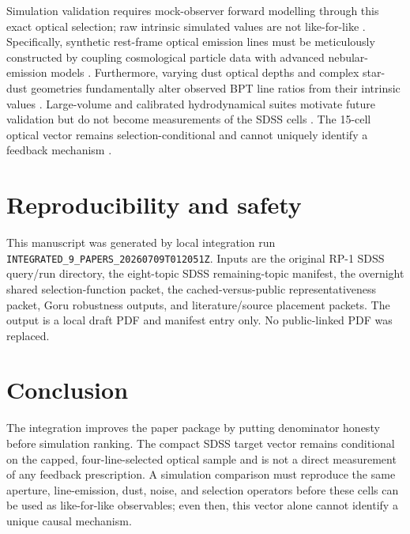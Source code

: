 \documentclass[twocolumn]{aastex631}
\begin{document}
Simulation validation requires mock-observer forward modelling through this exact optical selection; raw intrinsic simulated values are not like-for-like \citep{schaye2023}. Specifically, synthetic rest-frame optical emission lines must be meticulously constructed by coupling cosmological particle data with advanced nebular-emission models \citep{hirschmann2023}. Furthermore, varying dust optical depths and complex star-dust geometries fundamentally alter observed BPT line ratios from their intrinsic values \citep{vijayan2023}. Large-volume and calibrated hydrodynamical suites motivate future validation but do not become measurements of the SDSS cells \citep{bose2023}. The 15-cell optical vector remains selection-conditional and cannot uniquely identify a feedback mechanism \citep{kugel2023}.

\section{Reproducibility and safety}\label{sec:repro}
This manuscript was generated by local integration run \texttt{INTEGRATED\_9\_PAPERS\_20260709T012051Z}. Inputs are the original RP-1 SDSS query/run directory, the eight-topic SDSS remaining-topic manifest, the overnight shared selection-function packet, the cached-versus-public representativeness packet, Goru robustness outputs, and literature/source placement packets. The output is a local draft PDF and manifest entry only. No public-linked PDF was replaced.

\section{Conclusion}\label{sec:conclusion}
The integration improves the paper package by putting denominator honesty before simulation ranking. The compact SDSS target vector remains conditional on the capped, four-line-selected optical sample and is not a direct measurement of any feedback prescription. A simulation comparison must reproduce the same aperture, line-emission, dust, noise, and selection operators before these cells can be used as like-for-like observables; even then, this vector alone cannot identify a unique causal mechanism.
\end{document}
